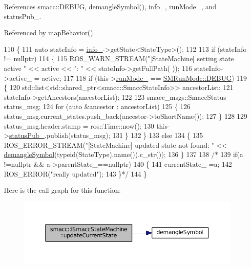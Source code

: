 References smacc\+::\+D\+E\+B\+UG, demangle\+Symbol(), info\+\_\+, run\+Mode\+\_\+, and status\+Pub\+\_\+.



Referenced by map\+Behavior().


\begin{DoxyCode}
110 \{
111     \textcolor{keyword}{auto} stateInfo = \hyperlink{classsmacc_1_1ISmaccStateMachine_a5ec3201cbddab4f062f572fb33021041}{info\_}->getState<StateType>();
112 
113     \textcolor{keywordflow}{if} (stateInfo != \textcolor{keyword}{nullptr})
114     \{
115         ROS\_WARN\_STREAM(\textcolor{stringliteral}{"[StateMachine] setting state active "} << active << \textcolor{stringliteral}{": "} << stateInfo->getFullPath(
      ));
116         stateInfo->active\_ = active;
117 
118         \textcolor{keywordflow}{if} (this->\hyperlink{classsmacc_1_1ISmaccStateMachine_a9f8cfbf577f7ae7a48b7a328e2e6b589}{runMode\_} == \hyperlink{namespacesmacc_a3e4f79486ea6ea6342dd3c712d16a4f6adc30ec20708ef7b0f641ef78b7880a15}{SMRunMode::DEBUG})
119         \{
120             std::list<std::shared\_ptr<smacc::SmaccStateInfo>> ancestorList;
121             stateInfo->getAncestors(ancestorList);
122 
123             smacc\_msgs::SmaccStatus status\_msg;
124             \textcolor{keywordflow}{for} (\textcolor{keyword}{auto} &ancestor : ancestorList)
125             \{
126                 status\_msg.current\_states.push\_back(ancestor->toShortName());
127             \}
128 
129             status\_msg.header.stamp = ros::Time::now();
130             this->\hyperlink{classsmacc_1_1ISmaccStateMachine_a7360ef485d5c83a3811dfe3eaa3a0c20}{statusPub\_}.publish(status\_msg);
131         \}
132     \}
133     \textcolor{keywordflow}{else}
134     \{
135         ROS\_ERROR\_STREAM(\textcolor{stringliteral}{"[StateMachine] updated state not found: "} << 
      \hyperlink{common_8h_a401d7e4f000fd4246a20be1e7d5ec2fc}{demangleSymbol}(\textcolor{keyword}{typeid}(StateType).name()).c\_str());
136     \}
137 
138     \textcolor{comment}{/*  }
139 \textcolor{comment}{        if(a !=nullptr && a->parentState\_==nullptr)}
140 \textcolor{comment}{        \{}
141 \textcolor{comment}{            currentState\_ =a;}
142 \textcolor{comment}{            ROS\_ERROR("really updated");}
143 \textcolor{comment}{        \}*/}
144 \}
\end{DoxyCode}


Here is the call graph for this function\+:
\nopagebreak
\begin{figure}[H]
\begin{center}
\leavevmode
\includegraphics[width=350pt]{classsmacc_1_1ISmaccStateMachine_aea0936b00b0186e8d4e514af16f69766_cgraph}
\end{center}
\end{figure}




